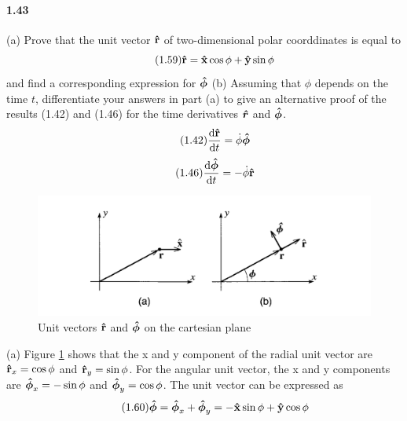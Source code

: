 \documentclass[../problems.tex]{subfiles}
\begin{document}
\paragraph{1.43}
(a) Prove that the unit vector $\vb{\hat{r}}$ of two-dimensional polar coorddinates is equal to
\begin{equation} \tag{1.59} \label{eq1.59}
    \vb{\hat{r}} = \vb{\hat{x}} \cos{\phi} + \vb{\hat{y}} \sin{\phi}
\end{equation}
and find a corresponding expression for $\vb*{\hat \phi}$ (b) Assuming that $\phi$ depends on the 
time $t$, differentiate your answers in part (a) to give an alternative proof of the results (1.42) 
and (1.46) for the time derivatives ${\vb*{\hat r}}$ and ${\vb*{\hat \phi}}$.
\barh
\begin{equation} \tag{1.42} \label{eq1.42}
    \dv{\vb{\hat r}}{t} = \dot{\phi} \vb*{\hat \phi}
\end{equation}
\begin{equation}
    \tag{1.46} \label{eq1.46}
    \dv{\vb*{\hat \phi}}{t} = -\dot{\phi} \vb{\hat r}
\end{equation}

\begin{figure} [ht]
    \centering 
    \includegraphics[scale=0.5]{fig1_43.png}
    \caption{Unit vectors $\vb{\hat{r}}$ and $\vb*{\hat \phi}$ on the cartesian plane}
    \label{fig1.6}
\end{figure}

(a) Figure \ref{fig1.6} shows that the x and y component of the radial unit vector are 
$\vb{\hat{r}}_x = \cos{\phi}$ and $\vb{\hat{r}}_y = \sin{\phi}$. For the angular unit vector, the x 
and y components are $\vb*{\hat \phi}_x = -\sin{\phi}$ and $\vb*{\hat \phi}_y = \cos{\phi}$. 
The unit vector can be expressed as
\begin{equation} \tag{1.60} \label{eq1.60}
    \vb*{\hat \phi} = \vb*{\hat \phi}_x + \vb*{\hat \phi}_y =  -\vb{\hat x} \sin{\phi}
    + \vb{\hat y}\cos{\phi} 
\end{equation}
\end{document}
